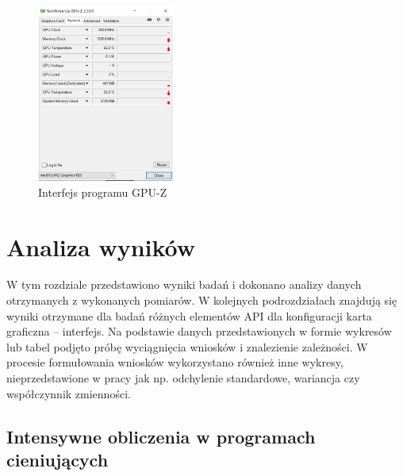 \documentclass[archive]{mgr}
\begin{document}
\begin{figure}[h!]
  \centering
    \includegraphics[width=0.4\textwidth]{images/gpuz.png}
   \caption{Interfejs programu GPU-Z}
   \label{lab:gpuz}
\end{figure}



\newpage


\section{Analiza wyników}

W tym rozdziale przedstawiono wyniki badań i dokonano analizy danych otrzymanych z wykonanych pomiarów. W kolejnych podrozdziałach znajdują się wyniki otrzymane dla badań różnych elementów API dla konfiguracji karta graficzna – interfejs. Na podstawie danych przedstawionych w formie wykresów lub tabel podjęto próbę wyciągnięcia wniosków i znalezienie zależności. W procesie formułowania wniosków wykorzystano również inne wykresy, nieprzedstawione w pracy jak np. odchylenie standardowe, wariancja czy współczynnik zmienności.


\subsection{Intensywne obliczenia w programach cieniujących}
\end{document}
